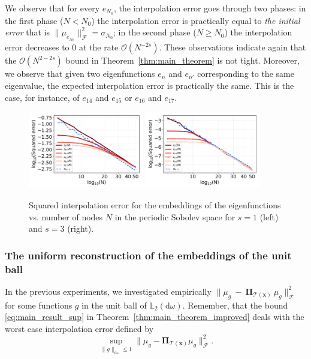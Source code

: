 \documentclass[twoside,11pt]{book}
\numberwithin{theorem}{chapter}
\numberwithin{definition}{chapter}
\numberwithin{proposition}{chapter}
\numberwithin{corollary}{chapter}
\numberwithin{example}{chapter}
\numberwithin{lemma}{chapter}
\numberwithin{assumption}{chapter}
\numberwithin{equation}{chapter}
\numberwithin{figure}{chapter}
\begin{document}
 We observe that for every $e_{N_{0}}$, the interpolation error goes through two phases: in the first phase ($N < N_{0}$) the interpolation error is practically equal to \emph{the initial error} that is $\|\mu_{e_{N_0}}\|_{\mathcal{F}}^{2} = \sigma_{N_{0}}$; in the second phase ($N \geq N_{0}$) the interpolation error decreases to $0$ at the rate $\mathcal{O}(N^{-2s})$. These observations indicate again that the $\mathcal{O}(N^{2-2s})$ bound in Theorem~\ref{thm:main_theorem} is not tight.
 Moreover, we observe that given two eigenfunctions $e_{n}$ and $e_{n'}$ corresponding to the same eigenvalue, the expected interpolation error is practically the same. This is the case, for instance, of $e_{14}$ and $e_{15}$ or $e_{16}$ and $e_{17}$.
\begin{figure}
\centering
\includegraphics[width=0.45\textwidth]{img/neurips/Sobolev/multig_interpolation_pSobolev_s_1_fig_1.pdf}
\includegraphics[width=0.45\textwidth]{img/neurips/Sobolev/multig_interpolation_pSobolev_s_3_fig_1.pdf}\\
\caption{Squared interpolation error for the embeddings of the eigenfunctions vs. number of nodes $N$ in the periodic Sobolev space for $s = 1$ (left) and $s=3$ (right).
\label{fig:pDPP_results_pSobolev_exp_2}}
\end{figure}
\subsubsection{The uniform reconstruction of the embeddings of the unit ball}



In the previous experiments, we investigated empirically $\|\mu_{g}~-~\bm{\Pi}_{\mathcal{T}(\bm{x})}~\mu_{g}\|_{\mathcal{F}}^{2}$ for some functions $g$ in the unit ball of $\mathbb{L}_{2}(\mathrm{d}\omega)$. Remember, that the bound \eqref{eq:main_result_sup} in Theorem~\ref{thm:main_theorem_improved} deals with the worst case interpolation error defined by
\begin{equation}\label{eq:worst_interpolation_error_supunitball}
\sup\limits_{\|g\|_{\mathrm{d}\omega} \leq 1} \|\mu_{g}-\bm{\Pi}_{\mathcal{T}(\bm{x})} \mu_{g}\|_{\mathcal{F}}^{2}.
\end{equation}
\end{document}
